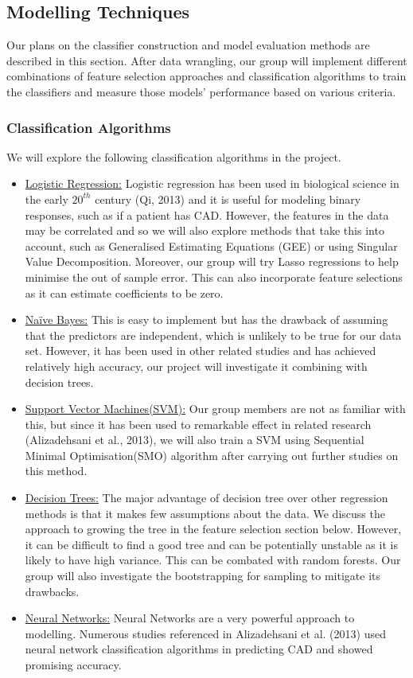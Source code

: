 \documentclass[a4paper, 12pt]{article}
\begin{document}
\subsection{Modelling Techniques}
Our plans on the classifier construction and model evaluation methods are described in this section. After data wrangling, our group will implement different combinations of feature selection approaches and classification algorithms to train the classifiers and measure those models' performance based on various criteria.
\subsubsection{Classification Algorithms}
We will explore the following classification algorithms in the project.
\begin{itemize}
    \item \underline{Logistic Regression:} Logistic regression has been used in biological science in the early $20^{th}$ century (Qi, 2013) and it is useful for modeling binary responses, such as if a patient has CAD. However, the features in the data may be correlated and so we will also explore methods that take this into account, such as Generalised Estimating Equations (GEE) or using Singular Value Decomposition. Moreover, our group will try Lasso regressions to help minimise the out of sample error. This can also incorporate feature selections as it can estimate coefficients to be zero.
    
    \item \underline{Naïve Bayes:} This is easy to implement but has the drawback of assuming that the predictors are independent, which is unlikely to be true for our data set. However, it has been used in other related studies and has achieved relatively high accuracy, our project will investigate it combining with decision trees.
    
    \item \underline{Support Vector Machines(SVM):} Our group members are not as familiar with this, but since it has been used to remarkable effect in related research (Alizadehsani et al., 2013), we will also train a SVM using Sequential Minimal Optimisation(SMO) algorithm after carrying out further studies on this method.
    
    \item \underline{Decision Trees:} The major advantage of decision tree over other regression methods is that it makes few assumptions about the data. We discuss the approach to growing the tree in the feature selection section below. However, it can be difficult to find a good tree and can be potentially unstable as it is likely to have high variance. This can be combated with random forests. Our group will also investigate the bootstrapping for sampling to mitigate its drawbacks.
    
    \item \underline{Neural Networks:} Neural Networks are a very powerful approach to modelling. Numerous studies referenced in Alizadehsani et al. (2013) used neural network classification algorithms in predicting CAD and showed promising accuracy.
    
\end{itemize}
\end{document}
